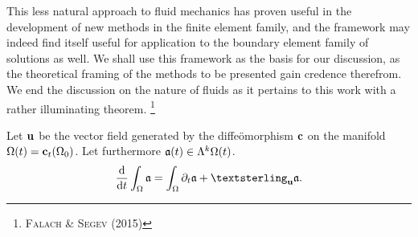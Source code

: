 \noindent
This less natural approach to fluid mechanics has proven useful in the development of new methods in the finite element family, and the framework may indeed find itself useful for application to the boundary element family of solutions as well.
We shall use this framework as the basis for our discussion, as the theoretical framing of the methods to be presented gain credence therefrom.
We end the discussion on the nature of fluids as it pertains to this work with a rather illuminating theorem.%
\footnote{%
  \cite{falach2015reynolds} \textsc{Falach} \& \textsc{Segev} (2015)
}

\begin{theorem}\label{thm:reynolds-transport}
  Let $\mathbf{u}$ be the vector field generated by the diffeömorphism $\mathbf{c}$ on the manifold $\Omega(t) = \mathbf{c}_t(\Omega_0)$.
  Let furthermore $\mathfrak{a}(t) \in \Lambda^k \Omega(t)$.
  \begin{equation}
        \frac{\dee}{\dee t} \int_{\Omega} \afrak = \int_{\Omega} \deet \afrak + \lieder{\uvec} \afrak.
  \end{equation}
\end{theorem}

